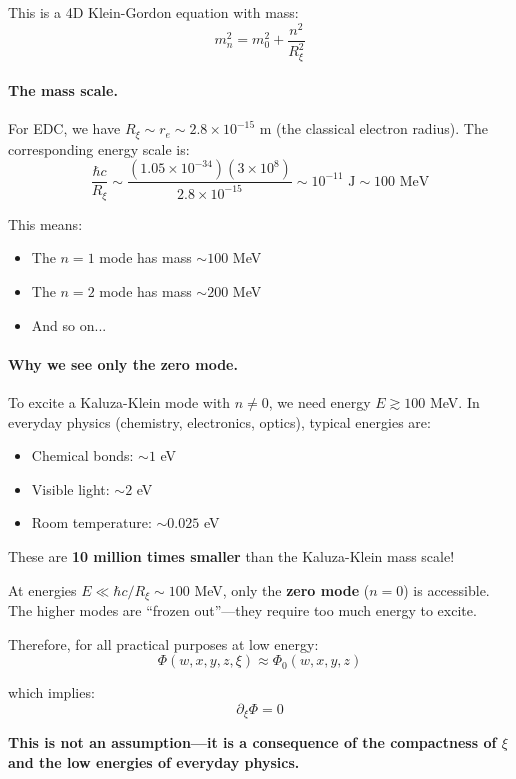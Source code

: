 This is a 4D Klein-Gordon equation with mass:
\begin{equation}
m_n^2 = m_0^2 + \frac{n^2}{R_\xi^2}
\end{equation}

\paragraph{The mass scale.}

For EDC, we have $R_\xi \sim r_e \sim 2.8 \times 10^{-15}$ m (the classical electron radius). The corresponding energy scale is:
\begin{equation}
\frac{\hbar c}{R_\xi} \sim \frac{(1.05 \times 10^{-34})(3 \times 10^8)}{2.8 \times 10^{-15}} \sim 10^{-11} \text{ J} \sim 100 \text{ MeV}
\end{equation}

This means:
\begin{itemize}
    \item The $n = 1$ mode has mass $\sim 100$ MeV
    \item The $n = 2$ mode has mass $\sim 200$ MeV
    \item And so on...
\end{itemize}

\paragraph{Why we see only the zero mode.}

To excite a Kaluza-Klein mode with $n \neq 0$, we need energy $E \gtrsim 100$ MeV. In everyday physics (chemistry, electronics, optics), typical energies are:
\begin{itemize}
    \item Chemical bonds: $\sim 1$ eV
    \item Visible light: $\sim 2$ eV
    \item Room temperature: $\sim 0.025$ eV
\end{itemize}

These are \textbf{10 million times smaller} than the Kaluza-Klein mass scale!

\begin{tcolorbox}[colback=blue!5,colframe=blue!70!black,title=The Low-Energy Approximation]
At energies $E \ll \hbar c / R_\xi \sim 100$ MeV, only the \textbf{zero mode} ($n = 0$) is accessible. The higher modes are ``frozen out''---they require too much energy to excite.

Therefore, for all practical purposes at low energy:
\begin{equation}
\Phi(w, x, y, z, \xi) \approx \Phi_0(w, x, y, z)
\end{equation}

which implies:
\begin{equation}
\boxed{\partial_\xi \Phi = 0}
\end{equation}

\textbf{This is not an assumption---it is a consequence of the compactness of $\xi$ and the low energies of everyday physics.}
\end{tcolorbox}

